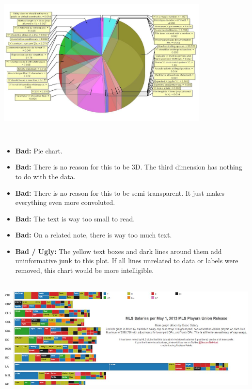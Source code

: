 \documentclass[
]{book}
\providecommand{\tightlist}{%
  \setlength{\itemsep}{0pt}\setlength{\parskip}{0pt}}
\begin{document}
~\\

\includegraphics[width=0.8\textwidth,height=\textheight]{img/vis6.jpg}

~

\begin{itemize}
\tightlist
\item
  \textbf{Bad:} Pie chart.
\item
  \textbf{Bad:} There is no reason for this to be 3D. The third dimension has nothing to do with the data.
\item
  \textbf{Bad:} There is no reason for this to be semi-transparent. It just makes everything even more convoluted.
\item
  \textbf{Bad:} The text is way too small to read.
\item
  \textbf{Bad:} On a related note, there is way too much text.\\
\item
  \textbf{Bad / Ugly:} The yellow text boxes and dark lines around them add uninformative junk to this plot. If all lines unrelated to data or labels were removed, this chart would be more intelligible.
\end{itemize}

~\\

\includegraphics{img/vis7.jpeg}

~
\end{document}
